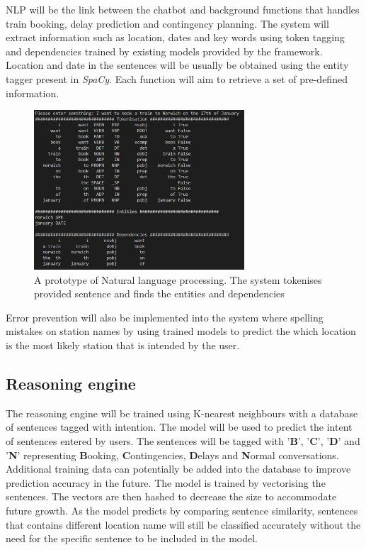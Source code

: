 \documentclass[11pt]{article}
\begin{document}
NLP will be the link between the chatbot and background functions that handles train booking, delay prediction and contingency planning. The system will extract information such as location, dates and key words using token tagging and dependencies trained by existing models provided by the framework. Location and date in the sentences will be usually be obtained using the entity tagger present in \textit{SpaCy}. Each function will aim to retrieve a set of pre-defined information.

\begin{figure}[!htb]
	\centering
	\includegraphics[width=0.7\textwidth]{NLP_Prototype}
	\caption{A prototype of Natural language processing. The system tokenises provided sentence and finds the entities and dependencies }\label{fig:NLP_Prototype}
\end{figure}

Error prevention will also be implemented into the system where spelling mistakes on station names by using trained models to predict the which location is the most likely station that is intended by the user.

\subsection{Reasoning engine}
The reasoning engine will be trained using K-nearest neighbours with a database of sentences tagged with intention. The model will be used to predict the intent of sentences entered by users. The sentences will be tagged with '\textbf{B}', '\textbf{C}', '\textbf{D}' and '\textbf{N}' representing \textbf{B}ooking, \textbf{C}ontingencies, \textbf{D}elays and \textbf{N}ormal conversations. Additional training data can potentially be added into the database to improve prediction accuracy in the future. The model is trained by vectorising the sentences. The vectors are then hashed to decrease the size to accommodate future growth. As the model predicts by comparing sentence similarity, sentences that contains different location name will still be classified accurately without the need for the specific sentence to be included in the model.
\end{document}
